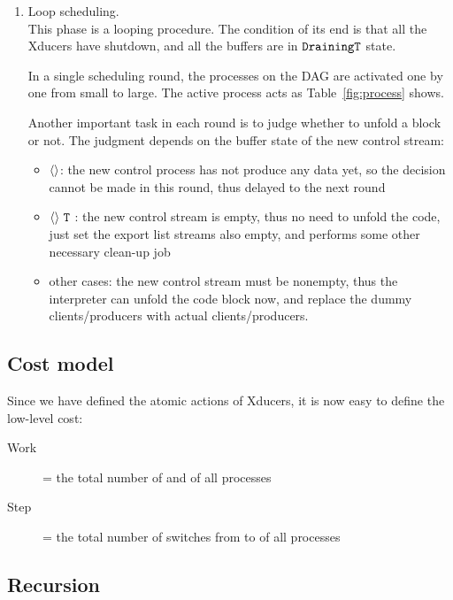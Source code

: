 \begin{enumerate}[(1)]
\begin{itemize}
\end{itemize}


\item Loop scheduling. \\ 
This phase is a looping procedure. The condition of its end is that all the Xducers have shutdown, and all the buffers are in ${\texttt{Draining}} \mathtt{T}$ state. 

In a single scheduling round, the processes on the DAG are activated one by one from small to large.
The active process acts as Table~\ref{fig:process} shows.

Another important task in each round is to judge whether to unfold a \wc block or not. The judgment depends on the buffer state of the new control stream:

\begin{itemize}
	\item {\filling} $\langle \rangle$: the new control process has not produce any data yet, so the decision cannot be made in this round, thus delayed to the next round
	\item {\draining} $\langle \rangle \ \mathtt{T}$ : the new control stream is empty, thus no need to unfold the code, just set the export list streams also empty, and performs some other necessary clean-up job  
	\item other cases: the new control stream must be nonempty, thus the interpreter can unfold the code block now, and replace the dummy clients/producers with actual clients/producers.
\end{itemize}







	
\end{enumerate}

\subsection{Cost model}
Since we have defined the atomic actions of Xducers, it is now easy to define the low-level cost:
\begin{description}
	\item[Work] = the total number of {\pin} and {\pout} of all processes
	\item[Step] = the total number of switches from {\filling} to {\draining} of all processes
\end{description}


\subsection{Recursion}

